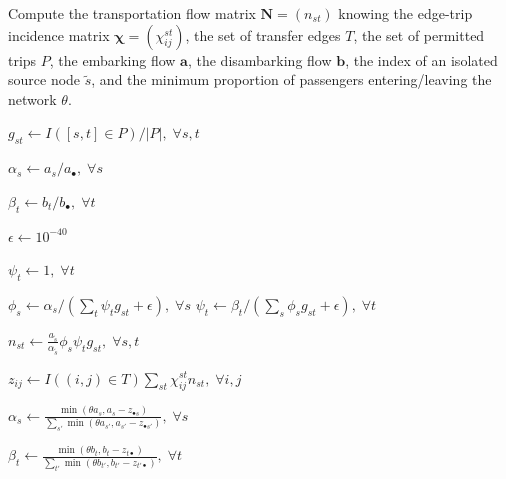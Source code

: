 \documentclass{bmcart}
\begin{document}
\begin{algorithm}[h]
	\caption{Compute the transportation flow matrix $\mathbf{N} = (n_{st})$ knowing the edge-trip incidence matrix $\bm{\chi} = (\chi_{ij}^{st})$, the set of transfer edges $T$, the set of permitted trips $P$, the embarking flow $\mathbf{a}$, the disambarking flow $\mathbf{b}$, the index of an isolated source node $\tilde{s}$, and the minimum proportion of passengers entering/leaving the network $\theta$.}
	\label{algo1}
	\begin{algorithmic}[1]
		\State $g_{st} \leftarrow I([s, t] \in P) / \vert P \vert, \; \forall s,t$ 
		
		\State $\alpha_s \leftarrow a_s / a_\bullet, \; \forall s$ 
		
		\State $\beta_t \leftarrow b_t / b_\bullet, \; \forall t$ 
		
		\State $\epsilon \leftarrow 10^{-40}$ 
		
		 
		
		\State $\psi_t \leftarrow 1, \; \forall t$
		
		 
		
		\State $\phi_s \leftarrow \alpha_s / (\sum_t \psi_t g_{st} + \epsilon), \; \forall s$
		\State $\psi_t \leftarrow \beta_t / (\sum_s \phi_s g_{st} + \epsilon), \; \forall t$
		
		\EndWhile
		
		\State $n_{st} \leftarrow \frac{a_{\tilde{s}}}{\alpha_{\tilde{s}}} \phi_s \psi_t g_{st}, \; \forall s,t$ 
		
		\State $z_{ij} \leftarrow I((i,j) \in T)\sum_{st} \chi_{ij}^{st} n_{st}, \; \forall i,j$
		
		\State $\alpha_s \leftarrow \frac{\min(\theta a_s, a_s - z_{\bullet s})}{\sum_{s'} \min(\theta a_{s'}, a_{s'} - z_{\bullet {s'}})}, \; \forall s$ 
		
		\State $\beta_t \leftarrow \frac{\min(\theta b_t, b_t - z_{t \bullet})}{\sum_{t'} \min(\theta b_{t'}, b_{t'} - z_{{t'} \bullet})}, \; \forall t$ 
		

\end{algorithmic}
\end{algorithm}
\end{document}

